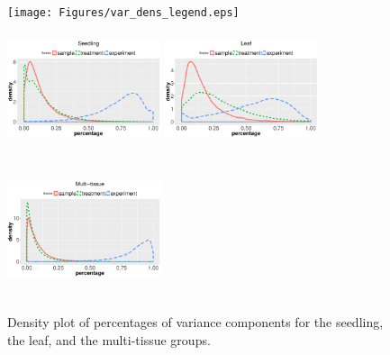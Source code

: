 \documentclass[letterpaper,12pt]{article}
\begin{document}
 \begin{figure}[h]
\begin{center}
\texttt{[image: Figures/var\_dens\_legend.eps]}
\includegraphics[width=4.5cm,height=4cm]{Figures/var_dens1.eps}
\includegraphics[width=4.5cm,height=4cm]{Figures/var_dens2.eps}
\includegraphics[width=4.5cm,height=4cm]{Figures/var_dens3.eps}
\caption{ Density plot of percentages of variance components for the seedling, the leaf, and the multi-tissue groups.}
\label{fig:densityplot}
\end{center}
\end{figure} 
\end{document}
